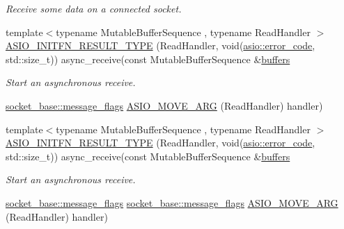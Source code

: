 \begin{DoxyCompactItemize}
\begin{DoxyCompactList}\small\item\em Receive some data on a connected socket. \end{DoxyCompactList}\item 
{\footnotesize template$<$typename Mutable\+Buffer\+Sequence , typename Read\+Handler $>$ }\\\hyperlink{classasio_1_1basic__seq__packet__socket_a16f77ed204f590bbc38a9390b2a3e625}{A\+S\+I\+O\+\_\+\+I\+N\+I\+T\+F\+N\+\_\+\+R\+E\+S\+U\+L\+T\+\_\+\+T\+Y\+P\+E} (Read\+Handler, void(\hyperlink{classasio_1_1error__code}{asio\+::error\+\_\+code}, std\+::size\+\_\+t)) async\+\_\+receive(const Mutable\+Buffer\+Sequence \&\hyperlink{group__async__read_ga54dede45c3175148a77fe6635222c47d}{buffers}
\begin{DoxyCompactList}\small\item\em Start an asynchronous receive. \end{DoxyCompactList}\item 
\hyperlink{classasio_1_1socket__base_ac3cf77465dfedfe1979b5415cf32cc94}{socket\+\_\+base\+::message\+\_\+flags} \hyperlink{classasio_1_1basic__seq__packet__socket_ad8e7f1ec0c106a68b50e2b03aea56dab}{A\+S\+I\+O\+\_\+\+M\+O\+V\+E\+\_\+\+A\+R\+G} (Read\+Handler) handler)
\item 
{\footnotesize template$<$typename Mutable\+Buffer\+Sequence , typename Read\+Handler $>$ }\\\hyperlink{classasio_1_1basic__seq__packet__socket_a16f77ed204f590bbc38a9390b2a3e625}{A\+S\+I\+O\+\_\+\+I\+N\+I\+T\+F\+N\+\_\+\+R\+E\+S\+U\+L\+T\+\_\+\+T\+Y\+P\+E} (Read\+Handler, void(\hyperlink{classasio_1_1error__code}{asio\+::error\+\_\+code}, std\+::size\+\_\+t)) async\+\_\+receive(const Mutable\+Buffer\+Sequence \&\hyperlink{group__async__read_ga54dede45c3175148a77fe6635222c47d}{buffers}
\begin{DoxyCompactList}\small\item\em Start an asynchronous receive. \end{DoxyCompactList}\item 
\hyperlink{classasio_1_1socket__base_ac3cf77465dfedfe1979b5415cf32cc94}{socket\+\_\+base\+::message\+\_\+flags} \hyperlink{classasio_1_1socket__base_ac3cf77465dfedfe1979b5415cf32cc94}{socket\+\_\+base\+::message\+\_\+flags} \hyperlink{classasio_1_1basic__seq__packet__socket_afcf51fb91143c72f9044b15f1faa6ba0}{A\+S\+I\+O\+\_\+\+M\+O\+V\+E\+\_\+\+A\+R\+G} (Read\+Handler) handler)
\end{DoxyCompactItemize}
